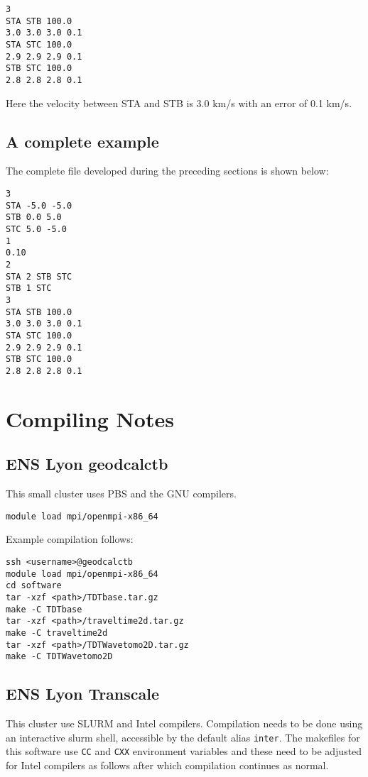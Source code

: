\documentclass[a4paper,12pt]{article}
\begin{document}
\begin{verbatim}
3
STA STB 100.0
3.0 3.0 3.0 0.1
STA STC 100.0
2.9 2.9 2.9 0.1
STB STC 100.0
2.8 2.8 2.8 0.1
\end{verbatim}

Here the velocity between STA and STB is 3.0 km/s with an error of 0.1 km/s.

\subsection{A complete example}

The complete file developed during the preceding sections is shown below:

\begin{verbatim}
3
STA -5.0 -5.0
STB 0.0 5.0
STC 5.0 -5.0
1
0.10
2
STA 2 STB STC
STB 1 STC
3
STA STB 100.0
3.0 3.0 3.0 0.1
STA STC 100.0
2.9 2.9 2.9 0.1
STB STC 100.0
2.8 2.8 2.8 0.1
\end{verbatim}

\section{Compiling Notes}

\subsection{ENS Lyon geodcalctb}

This small cluster uses PBS and the GNU compilers.

\begin{verbatim}
module load mpi/openmpi-x86_64
\end{verbatim}

Example compilation follows:

\begin{verbatim}
ssh <username>@geodcalctb
module load mpi/openmpi-x86_64
cd software
tar -xzf <path>/TDTbase.tar.gz
make -C TDTbase
tar -xzf <path>/traveltime2d.tar.gz
make -C traveltime2d
tar -xzf <path>/TDTWavetomo2D.tar.gz
make -C TDTWavetomo2D
\end{verbatim}


\subsection{ENS Lyon Transcale}

This cluster use SLURM and Intel compilers. Compilation needs to be
done using an interactive slurm shell, accessible by the
default alias {\tt inter}. The makefiles for this software use
{\tt CC} and {\tt CXX} environment variables and these need
to be adjusted for Intel compilers as follows after which
compilation continues as normal.
\end{document}
